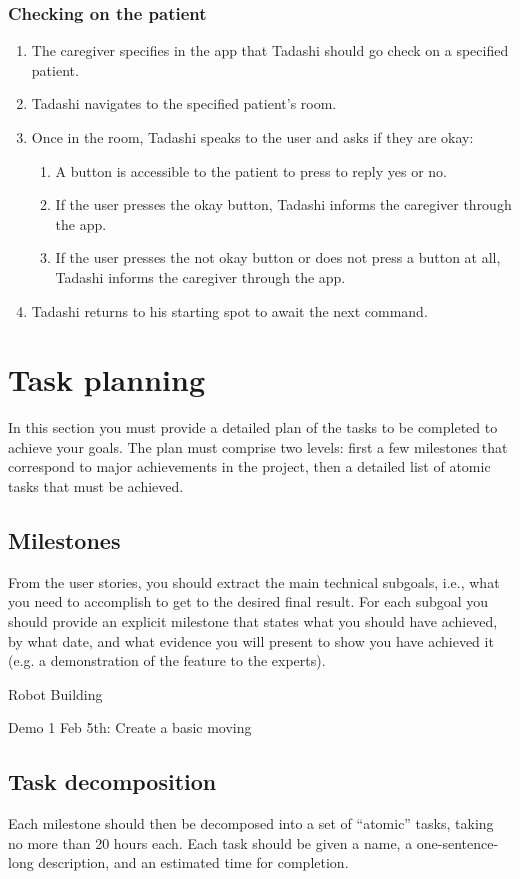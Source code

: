 \documentclass{article}
\begin{document}
\subsubsection{Checking on the patient}
\begin{enumerate}
\item The caregiver specifies in the app that Tadashi should go check on a specified patient. 
\item Tadashi navigates to the specified patient's room.
\item Once in the room, Tadashi speaks to the user and asks if they are okay:
  \begin{enumerate}
  \item A button is accessible to the patient to press to reply yes or no.
  \item If the user presses the okay button, Tadashi informs the caregiver through the app. 
  \item If the user presses the not okay button or does not press a button at all, Tadashi informs the caregiver through the app.
  \end{enumerate}
\item Tadashi returns to his starting spot to await the next command. 
\end{enumerate}

\section{Task planning}
In this section you must provide a detailed plan of the tasks to be completed to achieve your goals. The plan must comprise two levels: first a few milestones that correspond to major achievements in the project, then a detailed list of atomic tasks that must be achieved.

\subsection{Milestones} 
From the user stories, you should extract the main technical subgoals, i.e., what you need to accomplish to get to the desired final result. For each subgoal you should provide an explicit milestone that states what you should have achieved, by what date, and what evidence you will present to show you have achieved it (e.g. a demonstration of the feature to the experts).

Robot Building

Demo 1 Feb 5th: Create a basic moving 


\subsection{Task decomposition} 
Each milestone should then be decomposed into a set of ``atomic'' tasks, taking no more than 20 hours each. Each task should be given a name, a one-sentence-long description, and an estimated time for completion.
\end{document}
